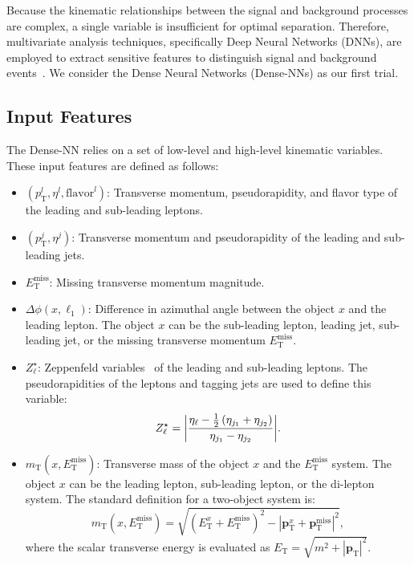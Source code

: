 \documentclass[12pt]{article}
\renewcommand{\vec}[1]{\boldsymbol{\mathbf{#1}}}
\begin{document}
    Because the kinematic relationships between the signal and background processes are complex, a single variable is insufficient for optimal separation. Therefore, multivariate analysis techniques, specifically Deep Neural Networks (DNNs), are employed to extract sensitive features to distinguish signal and background events~\cite{ATLAS:2025wuw}. We consider the Dense Neural Networks (Dense-NNs) as our first trial.

    \subsection{Input Features}%
    \label{sub:input_features}

        The Dense-NN relies on a set of low-level and high-level kinematic variables. These input features are defined as follows:
        \begin{itemize}
            \item $(p_{\text{T}}^{l}, \eta^{l}, \text{flavor}^{l})$: Transverse momentum, pseudorapidity, and flavor type of the leading and sub-leading leptons.

            \item $(p_{\text{T}}^{j}, \eta^{j})$: Transverse momentum and pseudorapidity of the leading and sub-leading jets.

            \item $E_{\text{T}}^{\text{miss}}$: Missing transverse momentum magnitude.

            \item $\Delta\phi(x, \ell_1)$: Difference in azimuthal angle between the object $x$ and the leading lepton. The object $x$ can be the sub-leading lepton, leading jet, sub-leading jet, or the missing transverse momentum $E_{\text{T}}^{\text{miss}}$.

            \item $Z_{\ell}^{\star}$: Zeppenfeld variables~\cite{Rainwater:1996ud} of the leading and sub-leading leptons. The pseudorapidities of the leptons and tagging jets are used to define this variable:
                \begin{equation}
                    Z_{\ell}^{\star} = \abs{\frac{\eta_\ell - \frac{1}{2} \left( \eta_{j_1} + \eta_{j_2} \right) }{\eta_{j_1} - \eta_{j_2}}}.
                \end{equation}

            \item $m_\text{T}(x, E_{\text{T}}^{\text{miss}})$: Transverse mass of the object $x$ and the $E_{\text{T}}^{\text{miss}}$ system. The object $x$ can be the leading lepton, sub-leading lepton, or the di-lepton system. The standard definition for a two-object system is:
                \begin{equation}
                    m_\text{T}(x, E_{\text{T}}^{\text{miss}}) = \sqrt{\left( E_{\text{T}}^{x} + E_{\text{T}}^{\text{miss} } \right)^2 - \left| \vec{p}_{\text{T}}^{x} + \vec{p}_{\text{T}}^{\text{miss}} \right|^2},
                \end{equation}
                where the scalar transverse energy is evaluated as $E_{\text{T}} = \sqrt{m^2 + |\vec{p}_{\text{T}}|^2}$.


\end{itemize}
\end{document}
